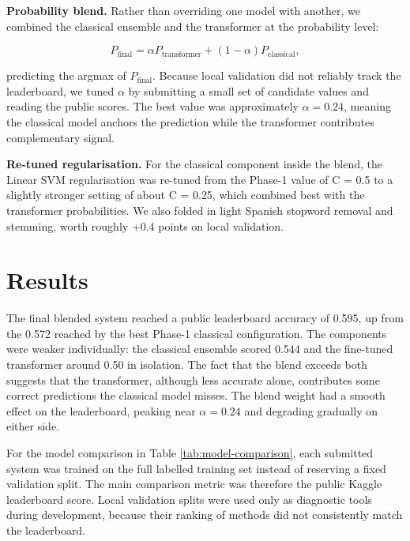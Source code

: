 \documentclass[9pt,a4paper,twoside]{utils/tau-class/tau}
\begin{document}
\textbf{Probability blend.} Rather than overriding one model with another, we combined the classical ensemble and the transformer at the probability level:

\begin{equation}
P_{\mathrm{final}} = \alpha P_{\mathrm{transformer}} + (1 - \alpha) P_{\mathrm{classical}},
\end{equation}

predicting the argmax of $P_{\mathrm{final}}$. Because local validation did not reliably track the leaderboard, we tuned $\alpha$ by submitting a small set of candidate values and reading the public scores. The best value was approximately $\alpha = 0.24$, meaning the classical model anchors the prediction while the transformer contributes complementary signal.

\textbf{Re-tuned regularisation.} For the classical component inside the blend, the Linear SVM regularisation was re-tuned from the Phase-1 value of C = 0.5 to a slightly stronger setting of about C = 0.25, which combined best with the transformer probabilities. We also folded in light Spanish stopword removal and stemming, worth roughly +0.4 points on local validation.

\section{Results}

The final blended system reached a public leaderboard accuracy of 0.595, up from the 0.572 reached by the best Phase-1 classical configuration. The components were weaker individually: the classical ensemble scored 0.544 and the fine-tuned transformer around 0.50 in isolation. The fact that the blend exceeds both suggests that the transformer, although less accurate alone, contributes some correct predictions the classical model misses. The blend weight had a smooth effect on the leaderboard, peaking near $\alpha = 0.24$ and degrading gradually on either side.

For the model comparison in Table \ref{tab:model-comparison}, each submitted system was trained on the full labelled training set instead of reserving a fixed validation split. The main comparison metric was therefore the public Kaggle leaderboard score. Local validation splits were used only as diagnostic tools during development, because their ranking of methods did not consistently match the leaderboard.
\end{document}
